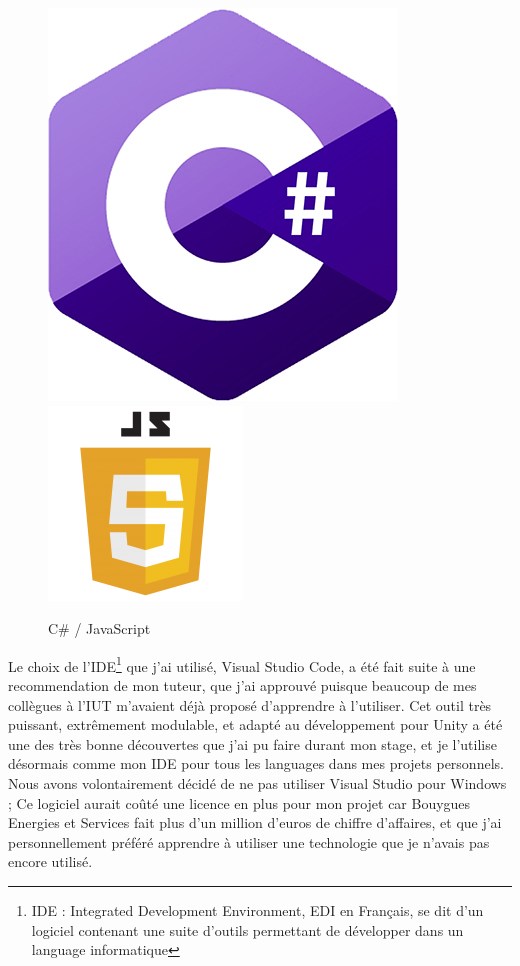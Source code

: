\documentclass[a4paper]{article}
\begin{document}
    \begin{figure}[H]
        \centering
        \includegraphics[scale=0.35]{img/logo-csharp}
        \hspace{10pt}
        \includegraphics[scale=0.75]{img/logo-javascript}
        \caption{C\# / JavaScript}
    \end{figure}

    Le choix de l'IDE\footnote{IDE : Integrated Development Environment, EDI en Français, se dit d'un logiciel contenant une suite d'outils permettant de développer dans un language informatique} que j'ai utilisé, Visual Studio Code, a été fait suite à une recommendation de mon tuteur, que j'ai approuvé puisque beaucoup de mes collègues à l'IUT m'avaient déjà proposé d'apprendre à l'utiliser. Cet outil très puissant, extrêmement modulable, et adapté au développement pour Unity a été une des très bonne découvertes que j'ai pu faire durant mon stage, et je l'utilise désormais comme mon IDE pour tous les languages dans mes projets personnels. Nous avons volontairement décidé de ne pas utiliser Visual Studio pour Windows ; Ce logiciel aurait coûté une licence en plus pour mon projet car Bouygues Energies et Services fait plus d'un million d'euros de chiffre d'affaires, et que j'ai personnellement préféré apprendre à utiliser une technologie que je n'avais pas encore utilisé. \\
\end{document}
